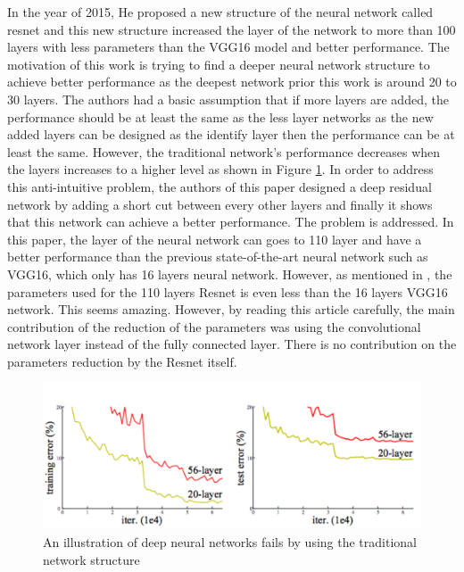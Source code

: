 \documentclass[a4paper,12pt]{article}
\begin{document}
In the year of 2015, He proposed a new structure of the neural network called resnet\cite{DBLP:journals/corr/HeZRS15} and this new structure increased the layer of the network to more than 100 layers with less parameters than the VGG16 model and better performance. The motivation of this work is trying to find a deeper neural network structure to achieve better performance as the deepest network prior this work is around 20 to 30 layers. The authors had a basic assumption that if more layers are added, the performance should be at least the same as the less layer networks as the new added layers can be designed as the identify layer then the performance can be at least the same. However, the traditional network's performance decreases when the layers increases to a higher level as shown in Figure \ref{fig:resnet}. In order to address this anti-intuitive problem, the authors of this paper designed a deep residual network by adding a short cut between every other layers and finally it shows that this network can achieve a better performance. The problem is addressed. In this paper, the layer of the neural network can goes to 110 layer and have a better performance than the previous state-of-the-art neural network such as VGG16\cite{SimonyanZ14a}, which only has 16 layers neural network. However, as mentioned in \cite{DBLP:journals/corr/HeZRS15}, the parameters used for the 110 layers Resnet is even less than the 16 layers VGG16 network. This seems amazing. However, by reading this article carefully, the main contribution of the reduction of the parameters was using the convolutional network layer instead of the fully connected layer. There is no contribution on the parameters reduction by the Resnet itself.\\
\begin{figure}[H]
  \begin{center}
      \includegraphics[scale=0.5]{renet1.png}
\end{center}
\caption{An illustration of deep neural networks fails by using the traditional network structure}
 \label{fig:resnet}
 \end{figure}
\end{document}
